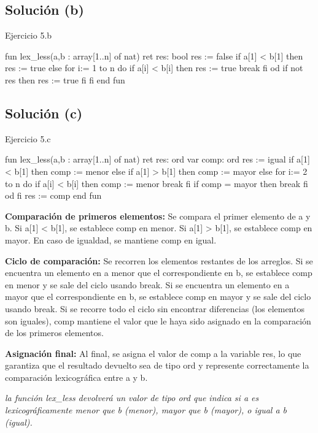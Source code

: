 \subsection{Solución (b)}
\begin{codebox}{Ejercicio 5.b}
\begin{pascallike}
fun lex_less(a,b : array[1..n] of nat) ret res: bool
res := false
if a[1] < b[1] then
    res := true
else
    for i:= 1 to n do
        if a[i] < b[i] then
            res := true
            break
        fi
    od
    if not res then
    res := true
    fi
fi
end fun
\end{pascallike}
\end{codebox}

\subsection{Solución (c)}
\begin{codebox}{Ejercicio 5.c}
\begin{pascallike}
fun lex_less(a,b : array[1..n] of nat) ret res: ord
var comp: ord
res := igual
if a[1] < b[1] then
comp := menor
else if a[1] > b[1] then
comp := mayor
else
for i:= 2 to n do
    if a[i] < b[i] then
        comp := menor
        break
    fi
    if comp = mayor then
        break
    fi
od
fi
res := comp
end fun
\end{pascallike}
\end{codebox}

\textbf{Comparación de primeros elementos:} Se compara el primer elemento de a y b. Si a[1] < b[1], se establece comp en menor. Si a[1] > b[1], se establece comp en mayor. En caso de igualdad, se mantiene comp en igual.

\textbf{Ciclo de comparación:} Se recorren los elementos restantes de los arreglos. Si se encuentra un elemento en a menor que el correspondiente en b, se establece comp en menor y se sale del ciclo usando break. Si se encuentra un elemento en a mayor que el correspondiente en b, se establece comp en mayor y se sale del ciclo usando break. Si se recorre todo el ciclo sin encontrar diferencias (los elementos son iguales), comp mantiene el valor que le haya sido asignado en la comparación de los primeros elementos.

\textbf{Asignación final:} Al final, se asigna el valor de comp a la variable res, lo que garantiza que el resultado devuelto sea de tipo ord y represente correctamente la comparación lexicográfica entre a y b.

\textit{la función lex\_less devolverá un valor de tipo ord que indica si a es lexicográficamente menor que b (menor), mayor que b (mayor), o igual a b (igual).}

